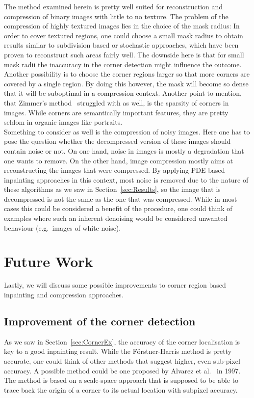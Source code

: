 The method examined herein is pretty well suited for reconstruction and compression of binary images
with little to no texture. 
The problem of the compression of highly textured images lies in the choice of the mask radius:
In order to cover textured regions, one could choose a small mask radius to obtain results similar
to subdivision based or stochastic approaches, which have been proven to reconstruct such areas
fairly well.
The downside here is that for small mask radii the
inaccuracy in the corner detection might influence the outcome. Another possibility is to choose
the corner regions larger so that more corners are covered by a single region. By doing this
however, the mask will become so dense that it will be suboptimal in a compression context.
Another point to mention, that Zimmer's method~\cite{zimmer07} struggled with as well, is the sparsity
of corners in images. While corners are semantically important features, they are pretty seldom in
organic images like portraits.\\
Something to consider as well is the compression of noisy images. Here one has to pose the question
whether the decompressed version of these images should contain noise or not. On one hand, noise in
images is mostly a degradation that one wants to remove. On the other hand, image compression
mostly aims at reconstructing the images that were compressed. By applying PDE based inpainting
approaches in this context, most noise is removed due to the nature of these algorithms as we saw
in Section~\ref{sec:Results}, so the image that is decompressed is not the same as the one that was
compressed. While in most cases this could be considered a benefit of the procedure, one could
think of examples where such an inherent denoising would be considered unwanted behaviour (e.g.\ images
of white noise).

\section{Future Work}\label{sec:FutureWork}

Lastly, we will discuss some possible improvements to corner region based inpainting and
compression approaches.

\subsection*{Improvement of the corner detection}

As we saw in Section~\ref{sec:CornerEx}, the accuracy of the corner localisation is key to a good
inpainting result. While the Förstner-Harris method is pretty accurate, one could think of other
methods that suggest higher, even sub-pixel accuracy. A possible method could be one proposed by
Alvarez et al.~\cite{amss} in 1997. \\
The method is based on a scale-space approach that is supposed
to be able to trace back the origin of a corner to its actual location with subpixel accuracy.

